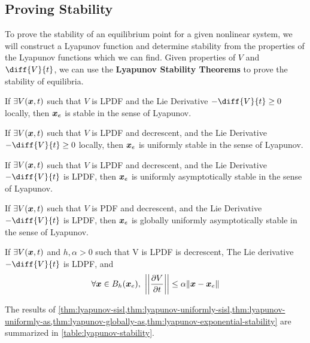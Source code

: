 \subsection{Proving Stability}
To prove the stability of an equilibrium point for a given nonlinear system, we
will construct a Lyapunov function and determine stability from the properties
of the Lyapunov functions which we can find. Given properties of $V$ and $\diff{V}{t}$, we can use the \textbf{Lyapunov
Stability Theorems} to prove the stability of equilibria.
\begin{theorem}
	If $\exists V(\boldsymbol{x}, t)$ such that $V$ is LPDF and the Lie Derivative
	$-\diff{V}{t} \geq 0$ locally, then $\boldsymbol{x}_e$ is stable in the sense of
	Lyapunov.
	\label{thm:lyapunov-sisl}
\end{theorem}
\begin{theorem}
	If $\exists V(\boldsymbol{x}, t)$ such that $V$ is LPDF and decrescent, and the Lie Derivative
	$-\diff{V}{t} \geq 0$ locally, then $\boldsymbol{x}_e$ is uniformly stable in the sense of
	Lyapunov.
	\label{thm:lyapunov-uniformly-sisl}
\end{theorem}
\begin{theorem}
	If $\exists V(\boldsymbol{x}, t)$ such that $V$ is LPDF and decrescent, and the Lie Derivative
	$-\diff{V}{t}$ is LPDF, then $\boldsymbol{x}_e$ is uniformly asymptotically stable in the sense of
	Lyapunov.
	\label{thm:lyapunov-uniformly-as}
\end{theorem}
\begin{theorem}
	If $\exists V(\boldsymbol{x}, t)$ such that $V$ is PDF and decrescent, and the Lie Derivative
	$-\diff{V}{t}$ is LPDF, then $\boldsymbol{x}_e$ is globally uniformly asymptotically stable in the sense of
	Lyapunov.
	\label{thm:lyapunov-globally-as}
\end{theorem}
\begin{theorem}
	If $\exists V(\boldsymbol{x}, t)$ and $h, \alpha > 0$ such that V is LPDF is
	decrescent, The Lie derivative $-\diff{V}{t}$ is LDPF, and \[
		\forall \bs{x}\in B_h(\bs{x}_e),\ \left\lvert\left\lvert\frac{\partial
		V}{\partial t}\right\rvert\right\rvert \leq \alpha \|\bs{x}-\bs{x}_e\|
	\]
	\label{thm:lyapunov-exponential-stability}
\end{theorem}
The results of
\cref{thm:lyapunov-sisl,thm:lyapunov-uniformly-sisl,thm:lyapunov-uniformly-as,thm:lyapunov-globally-as,thm:lyapunov-exponential-stability}
are summarized in \cref{table:lyapunov-stability}.
